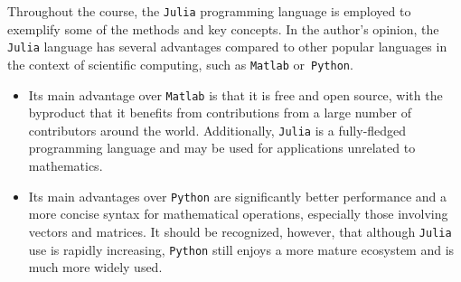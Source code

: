 Throughout the course, the \texttt{Julia} programming language is employed to exemplify some of the methods and key concepts.
In the author's opinion,
the \texttt{Julia} language has several advantages compared to other popular languages in the context of scientific computing,
such as \texttt{Matlab} or~\texttt{Python}.
%
\begin{itemize}
    \item
        Its main advantage over \texttt{Matlab} is that it is free and open source,
        with the byproduct that it benefits from contributions from a large number of contributors around the world.
        Additionally, \texttt{Julia} is a fully-fledged programming language and may be used for applications unrelated to mathematics.

    \item
        Its main advantages over \texttt{Python} are significantly better performance and a more concise syntax for mathematical operations,
        especially those involving vectors and matrices.
        It should be recognized, however, that although \texttt{Julia} use is rapidly increasing,
        \texttt{Python} still enjoys a more mature ecosystem and is much more widely used.
\end{itemize}
